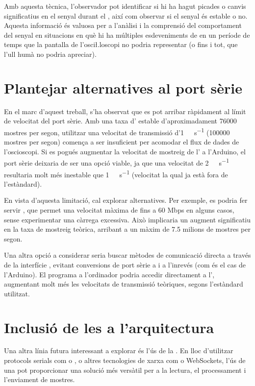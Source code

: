 \documentclass{tfgitic}[2023/07/07]
\begin{document}
Amb aquesta tècnica, l'observador pot identificar si hi ha hagut
picades o canvis significatius en el senyal durant el ,
així com observar si el senyal és estable o no. Aquesta informació és
valuosa per a l'anàlisi i la comprensió del comportament del senyal en
situacions en què hi ha múltiples esdeveniments de  en un
període de temps que la pantalla de l'osci\l.loscopi no podria
representar (o fins i tot, que l'ull humà no podria apreciar).

\section{Plantejar alternatives al port sèrie}

En el marc d'aquest treball, s'ha observat que es pot arribar
ràpidament al límit de velocitat del port sèrie. Amb una taxa
d' estable d'aproximadament \num{76000} mostres per segon,
utilitzar una velocitat de transmissió d'\SI{1}{\mega\bit\per\second}
(\num{100000} mostres per segon) comença a ser insuficient per
acomodar el flux de dades de l'osci\lgem oscopi. Si es pogués
augmentar la velocitat de mostreig de l' a l'Arduino, el
port sèrie deixaria de ser una opció viable, ja que una velocitat de
\SI{2}{\mega\bit\per\second} resultaria molt més inestable que
\SI{1}{\mega\bit\per\second} (velocitat la qual ja està fora de
l'estàndard).

En vista d'aquesta limitació, cal explorar alternatives. Per exemple,
es podria fer servir , que permet una velocitat màxima de
fins a 60 Mbps en alguns casos, sense experimentar una càrrega
excessiva. Això implicaria un augment significatiu en la taxa de
mostreig teòrica, arribant a un màxim de \num[round-precision=1]{7.5}
milions de mostres per segon.

Una altra opció a considerar seria buscar mètodes de comunicació
directa a través de la interfície , evitant conversions de
port sèrie a  i a l'inrevés (com és el cas de l'Arduino). El
programa a l'ordinador podria accedir directament a l',
augmentant molt més les velocitats de transmissió teòriques, segons
l'estàndard  utilitzat.

\section{Inclusió de les  a l'arquitectura}

Una altra línia futura interessant a explorar és l'ús de la \cite[Ràdio
  Definida per Software]{viqui-sdr}. En lloc d'utilitzar protocols
serials com  o , o altres tecnologies
de xarxa com  o WebSockets, l'ús de una 
pot proporcionar una solució més versàtil per a la lectura, el
processament i l'enviament de mostres.
\end{document}
